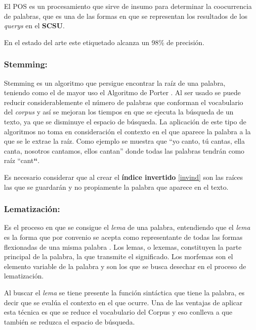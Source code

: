 \documentclass[
  12pt,
  openany]{book}
\begin{document}
El POS es un procesamiento que sirve de insumo para determinar la coocurrencia de palabras, que es una de las formas en que se representan los resultados de los \emph{querys} en el \textbf{SCSU}.

En el estado del arte este etiquetado alcanza un 98\% de precisión.

\hypertarget{steaming}{%
\subsubsection{Stemming:}\label{steaming}}

Stemming es un algoritmo que persigue encontrar la raíz de una palabra, teniendo como el de mayor uso el Algoritmo de Porter \citep{willett2006}. Al ser usado se puede reducir considerablemente el número de palabras que conforman el vocabulario del \emph{corpus} y así se mejoran los tiempos en que se ejecuta la búsqueda de un texto, ya que se disminuye el espacio de búsqueda. La aplicación de este tipo de algoritmos no toma en consideración el contexto en el que aparece la palabra a la que se le extrae la raíz. Como ejemplo se muestra que ``yo canto, tú cantas, ella canta, nosotros cantamos, ellos cantan'' donde todas las palabras tendrán como raíz ``cant\textbf{``}.

Es necesario considerar que al crear el \textbf{índice invertido} \ref{invind} son las raíces las que se guardarán y no propiamente la palabra que aparece en el texto.

\hypertarget{lemma}{%
\subsubsection{Lematización:}\label{lemma}}

Es el proceso en que se consigue el \emph{lema} de una palabra, entendiendo que el \emph{lema} es la forma que por convenio se acepta como representante de todas las formas flexionadas de una misma palabra \citep{demarneffe2021}. Los lemas, o lexemas, constituyen la parte principal de la palabra, la que transmite el significado. Los morfemas son el elemento variable de la palabra y son los que se busca desechar en el proceso de lematización.

Al buscar el \emph{lema} se tiene presente la función sintáctica que tiene la palabra, es decir que se evalúa el contexto en el que ocurre. Una de las ventajas de aplicar esta técnica es que se reduce el vocabulario del Corpus y eso conlleva a que también se reduzca el espacio de búsqueda.
\end{document}

